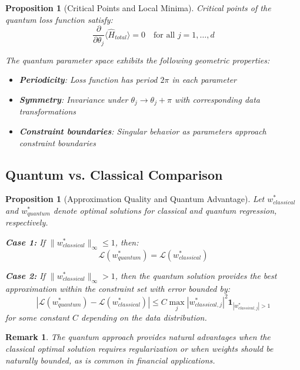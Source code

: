 \documentclass[11pt]{article}
\newtheorem{proposition}[theorem]{Proposition}
\newtheorem{remark}[theorem]{Remark}
\begin{document}
\begin{proposition}[Critical Points and Local Minima]
Critical points of the quantum loss function satisfy:
\begin{equation}
\frac{\partial}{\partial \theta_j} \langle \hat{H}_{total} \rangle = 0 \quad \text{for all } j = 1, \ldots, d
\end{equation}

The quantum parameter space exhibits the following geometric properties:
\begin{itemize}
\item \textbf{Periodicity}: Loss function has period $2\pi$ in each parameter
\item \textbf{Symmetry}: Invariance under $\theta_j \to \theta_j + \pi$ with corresponding data transformations
\item \textbf{Constraint boundaries}: Singular behavior as parameters approach constraint boundaries
\end{itemize}
\end{proposition}

\subsection{Quantum vs. Classical Comparison}

\begin{proposition}[Approximation Quality and Quantum Advantage]
Let $w^*_{classical}$ and $w^*_{quantum}$ denote optimal solutions for classical and quantum regression, respectively.

\textbf{Case 1:} If $\|w^*_{classical}\|_\infty \leq 1$, then:
\begin{equation}
\mathcal{L}(w^*_{quantum}) = \mathcal{L}(w^*_{classical})
\end{equation}

\textbf{Case 2:} If $\|w^*_{classical}\|_\infty > 1$, then the quantum solution provides the best approximation within the constraint set with error bounded by:
\begin{equation}
|\mathcal{L}(w^*_{quantum}) - \mathcal{L}(w^*_{classical})| \leq C \max_j |w^*_{classical,j}|^2 \mathbf{1}_{|w^*_{classical,j}| > 1}
\end{equation}
for some constant $C$ depending on the data distribution.
\end{proposition}

\begin{remark}
The quantum approach provides natural advantages when the classical optimal solution requires regularization or when weights should be naturally bounded, as is common in financial applications.
\end{remark}
\end{document}
